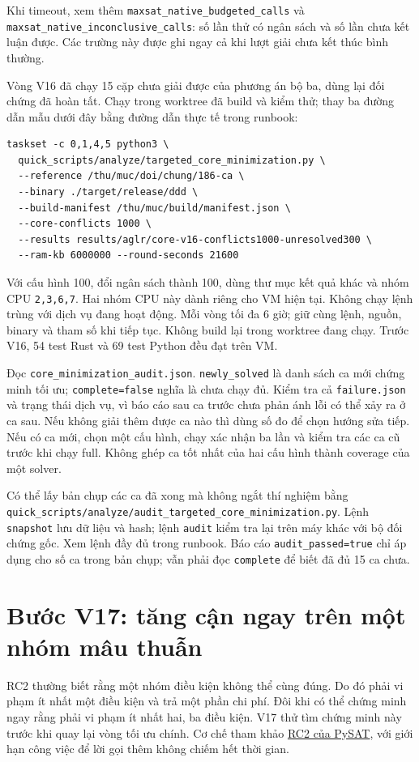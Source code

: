 \documentclass[11pt,a4paper]{article}
\newcommand{\code}[1]{\texttt{#1}}
\newcommand{\file}[1]{\nolinkurl{#1}}
\begin{document}
Khi timeout, xem thêm \code{maxsat\_native\_budgeted\_calls} và
\code{maxsat\_native\_inconclusive\_calls}: số lần thử có ngân sách và số
lần chưa kết luận được. Các trường này được ghi ngay cả khi lượt giải
chưa kết thúc bình thường.

Vòng V16 đã chạy 15 cặp chưa giải được của phương án bộ ba, dùng
lại đối chứng đã hoàn tất. Chạy trong worktree đã build và kiểm thử;
thay ba đường dẫn mẫu dưới đây bằng đường dẫn thực tế trong runbook:
\begin{verbatim}
taskset -c 0,1,4,5 python3 \
  quick_scripts/analyze/targeted_core_minimization.py \
  --reference /thu/muc/doi/chung/186-ca \
  --binary ./target/release/ddd \
  --build-manifest /thu/muc/build/manifest.json \
  --core-conflicts 1000 \
  --results results/aglr/core-v16-conflicts1000-unresolved300 \
  --ram-kb 6000000 --round-seconds 21600
\end{verbatim}
Với cấu hình 100, đổi ngân sách thành 100, dùng thư mục kết quả khác và
nhóm CPU \code{2,3,6,7}. Hai nhóm CPU này dành riêng cho VM hiện tại.
Không chạy lệnh trùng với dịch vụ đang hoạt động. Mỗi vòng tối đa 6 giờ;
giữ cùng lệnh, nguồn, binary và tham số khi tiếp tục. Không build lại trong
worktree đang chạy. Trước V16, 54 test Rust và 69 test Python đều đạt trên VM.

Đọc \file{core_minimization_audit.json}. \code{newly\_solved} là danh sách
ca mới chứng minh tối ưu; \code{complete=false} nghĩa là chưa chạy đủ.
Kiểm tra cả \file{failure.json} và trạng thái dịch vụ, vì báo cáo sau ca
trước chưa phản ánh lỗi có thể xảy ra ở ca sau. Nếu không giải thêm được
ca nào thì dùng số đo để chọn hướng sửa tiếp. Nếu có ca mới, chọn một
cấu hình, chạy xác nhận ba lần và kiểm tra các ca cũ trước khi chạy full.
Không ghép ca tốt nhất của hai cấu hình thành coverage của một solver.

Có thể lấy bản chụp các ca đã xong mà không ngắt thí nghiệm bằng
\file{quick_scripts/analyze/audit_targeted_core_minimization.py}.
Lệnh \code{snapshot} lưu dữ liệu và hash; lệnh \code{audit} kiểm tra lại
trên máy khác với bộ đối chứng gốc. Xem lệnh đầy đủ trong runbook. Báo cáo
\code{audit\_passed=true} chỉ áp dụng cho số ca trong bản chụp; vẫn phải
đọc \code{complete} để biết đã đủ 15 ca chưa.

\section{Bước V17: tăng cận ngay trên một nhóm mâu thuẫn}

RC2 thường biết rằng một nhóm điều kiện không thể cùng đúng. Do đó phải
vi phạm ít nhất một điều kiện và trả một phần chi phí. Đôi khi có thể
chứng minh ngay rằng phải vi phạm ít nhất hai, ba điều kiện. V17 thử tìm
chứng minh này trước khi quay lại vòng tối ưu chính. Cơ chế tham khảo
\href{https://pysathq.github.io/docs/html/api/examples/rc2.html#pysat.examples.rc2.RC2.exhaust_core}{RC2 của PySAT},
với giới hạn công việc để lời gọi thêm không chiếm hết thời gian.
\end{document}
